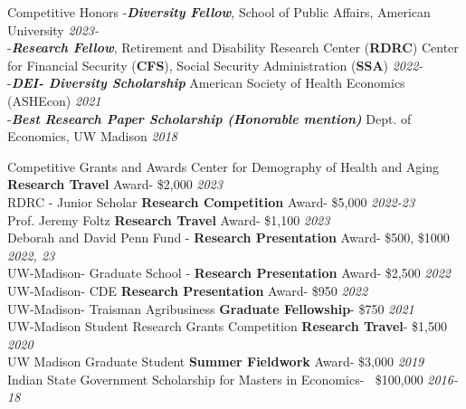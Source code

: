 \documentclass{resume} %
\begin{document}


\begin{rSection}{Competitive Honors}
-\textbf{\textit{Diversity Fellow}}, School of Public Affairs, American University \hfill \textit{2023-} \\
-\textbf{\textit{Research Fellow}}, Retirement and Disability Research Center (\textbf{RDRC}) Center for Financial Security (\textbf{CFS}), Social Security Administration (\textbf{SSA})  \hfill \textit{2022-} \\
-\textbf{\textit{DEI- Diversity Scholarship}} American Society of Health Economics (ASHEcon) \hfill \textit{2021} \\
-\textbf{\textit{Best Research Paper Scholarship (Honorable mention)}} Dept. of Economics, UW Madison \hfill \textit{2018}
\end{rSection}




\begin{rSection}{Competitive Grants and Awards}
Center for Demography of Health and Aging \textbf{Research Travel} Award- \$2,000 \hfill \textit{2023}	\\
RDRC - Junior Scholar \textbf{Research Competition} Award- \$5,000 \hfill \textit{2022-23}	\\
Prof. Jeremy Foltz \textbf{Research Travel} Award- \$1,100 \hfill \textit{2023}	\\
Deborah and David Penn Fund - \textbf{Research Presentation} Award- \$500, \$1000 \hfill \textit{2022, 23}	\\
UW-Madison- Graduate School - \textbf{Research Presentation} Award- \$2,500 \hfill \textit{2022}	\\
UW-Madison- CDE \textbf{Research Presentation} Award- \$950 \hfill \textit{2022} \\
UW-Madison- Traisman Agribusiness \textbf{Graduate Fellowship}- \$750 \hfill \textit{2021}	\\
UW-Madison Student Research Grants Competition \textbf{Research Travel}- \$1,500 \hfill \textit{2020}  \\
UW Madison Graduate Student \textbf{Summer Fieldwork} Award- \$3,000  \hfill \textit{2019}\\
Indian State Government Scholarship for Masters in Economics- $~$ \$100,000 \hfill \textit{2016-18}

\end{rSection}
\end{document}
